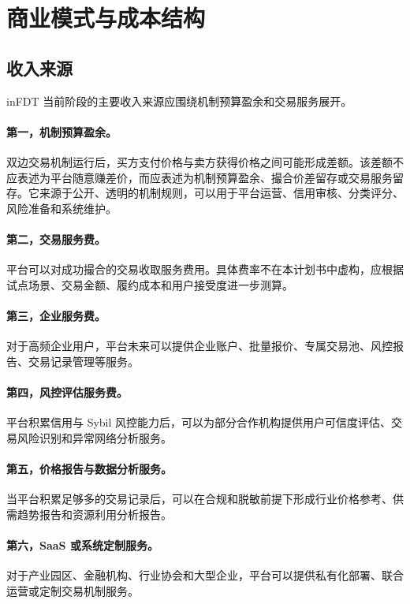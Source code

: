 \documentclass[UTF8,a4paper,12pt]{ctexart}
\begin{document}
\section{商业模式与成本结构}

\subsection{收入来源}

inFDT 当前阶段的主要收入来源应围绕机制预算盈余和交易服务展开。

\paragraph{第一，机制预算盈余。}
双边交易机制运行后，买方支付价格与卖方获得价格之间可能形成差额。该差额不应表述为平台随意赚差价，而应表述为机制预算盈余、撮合价差留存或交易服务留存。它来源于公开、透明的机制规则，可以用于平台运营、信用审核、分类评分、风险准备和系统维护。

\paragraph{第二，交易服务费。}
平台可以对成功撮合的交易收取服务费用。具体费率不在本计划书中虚构，应根据试点场景、交易金额、履约成本和用户接受度进一步测算。

\paragraph{第三，企业服务费。}
对于高频企业用户，平台未来可以提供企业账户、批量报价、专属交易池、风控报告、交易记录管理等服务。

\paragraph{第四，风控评估服务费。}
平台积累信用与 Sybil 风控能力后，可以为部分合作机构提供用户可信度评估、交易风险识别和异常网络分析服务。

\paragraph{第五，价格报告与数据分析服务。}
当平台积累足够多的交易记录后，可以在合规和脱敏前提下形成行业价格参考、供需趋势报告和资源利用分析报告。

\paragraph{第六，SaaS 或系统定制服务。}
对于产业园区、金融机构、行业协会和大型企业，平台可以提供私有化部署、联合运营或定制交易机制服务。
\end{document}
